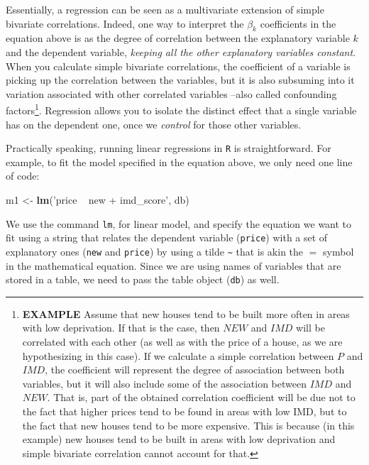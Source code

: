 \documentclass[
]{book}
\newenvironment{Shaded}{\begin{snugshade}}{\end{snugshade}}
\newcommand{\KeywordTok}[1]{\textcolor[rgb]{0.13,0.29,0.53}{\textbf{#1}}}
\newcommand{\NormalTok}[1]{#1}
\newcommand{\StringTok}[1]{\textcolor[rgb]{0.31,0.60,0.02}{#1}}
\begin{document}
Essentially, a regression can be seen as a multivariate extension of simple bivariate correlations. Indeed, one way to interpret the \(\beta_k\) coefficients in the equation above is as the degree of correlation between the explanatory variable \(k\) and the dependent variable, \emph{keeping all the other explanatory variables constant}. When you calculate simple bivariate correlations, the coefficient of a variable is picking up the correlation between the variables, but it is also subsuming into it variation associated with other correlated variables --also called confounding factors\footnote{\textbf{EXAMPLE} Assume that new houses tend to be built more often in areas with low deprivation. If that is the case, then \(NEW\) and \(IMD\) will be correlated with each other (as well as with the price of a house, as we are hypothesizing in this case). If we calculate a simple correlation between \(P\) and \(IMD\), the coefficient will represent the degree of association between both variables, but it will also include some of the association between \(IMD\) and \(NEW\). That is, part of the obtained correlation coefficient will be due not to the fact that higher prices tend to be found in areas with low IMD, but to the fact that new houses tend to be more expensive. This is because (in this example) new houses tend to be built in areas with low deprivation and simple bivariate correlation cannot account for that.}. Regression allows you to isolate the distinct effect that a single variable has on the dependent one, once we \emph{control} for those other variables.

Practically speaking, running linear regressions in \texttt{R} is straightforward. For example, to fit the model specified in the equation above, we only need one line of code:

\begin{Shaded}
\begin{Highlighting}[]
\NormalTok{m1 <-}\StringTok{ }\KeywordTok{lm}\NormalTok{(}\StringTok{'price ~ new + imd_score'}\NormalTok{, db)}
\end{Highlighting}
\end{Shaded}

We use the command \texttt{lm}, for linear model, and specify the equation we want to fit using a string that relates the dependent variable (\texttt{price}) with a set of explanatory ones (\texttt{new} and \texttt{price}) by using a tilde \texttt{\textasciitilde{}} that is akin the \(=\) symbol in the mathematical equation. Since we are using names of variables that are stored in a table, we need to pass the table object (\texttt{db}) as well.
\end{document}
